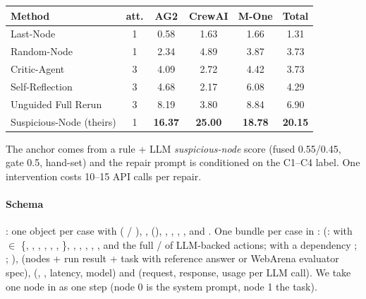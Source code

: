 \begin{center}\small\setlength{\tabcolsep}{3.5pt}
\begin{tabular}{@{}lccccc@{}}\toprule
Method & att. & AG2 & CrewAI & M-One & Total\\\midrule
Last-Node & 1 & 0.58 & 1.63 & 1.66 & 1.31\\
Random-Node & 1 & 2.34 & 4.89 & 3.87 & 3.73\\
Critic-Agent & 3 & 4.09 & 2.72 & 4.42 & 3.73\\
Self-Reflection & 3 & 4.68 & 2.17 & 6.08 & 4.29\\
Unguided Full Rerun & 3 & 8.19 & 3.80 & 8.84 & 6.90\\
Suspicious-Node (theirs) & 1 & \textbf{16.37} & \textbf{25.00} & \textbf{18.78} & \textbf{20.15}\\\bottomrule
\end{tabular}
\end{center}
The anchor comes from a rule + LLM \emph{suspicious-node} score (fused 0.55/0.45, gate 0.5, hand-set) and the repair prompt is conditioned on the C1--C4 label. One intervention costs 10--15 API calls per repair.

\paragraph{Schema} : one object per case with  ( / ), ,  (), , , , ,  and . One bundle per case in :  (:  with  $\in$ \{, , , , , , \}, , , , , ,  and the full  /  of LLM-backed actions;  with a dependency ; ; ),  (nodes + run result + task with reference answer or WebArena evaluator spec),  (, , latency, model) and  (request, response, usage per LLM call). We take one node in  as one step (node 0 is the system prompt, node 1 the task).

